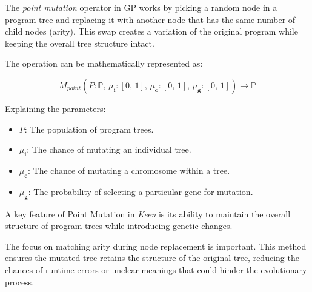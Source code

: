 \begin{definition}
    The \textit{point mutation} operator in GP works by picking a random node in a program tree and replacing it 
    with another node that has the same number of child nodes (arity). This swap creates a variation of the original 
    program while keeping the overall tree structure intact.

    The operation can be mathematically represented as:

    \begin{equation}
        M_{point}(P: \mathbb{P},\, \mu_\textbf{i}: [0,\, 1],\, \mu_\textbf{c}: [0,\, 1],\, \mu_\textbf{g}: [0,\, 1])
            \to \mathbb{P}
    \end{equation}

    Explaining the parameters:

    \begin{itemize}
        \item \(P\): The population of program trees.
        \item \(\mu_\textbf{i}\): The chance of mutating an individual tree.
        \item \(\mu_\textbf{c}\): The chance of mutating a chromosome within a tree.
        \item \(\mu_\textbf{g}\): The probability of selecting a particular gene for mutation.
    \end{itemize}
\end{definition}

A key feature of Point Mutation in \textit{Keen} is its ability to maintain the overall structure of program trees 
while introducing genetic changes.

\begin{remark}
    The focus on matching arity during node replacement is important. This method ensures the mutated tree retains 
    the structure of the original tree, reducing the chances of runtime errors or unclear meanings that could hinder 
    the evolutionary process.
\end{remark}
